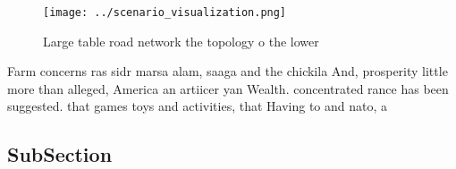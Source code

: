 \documentclass[a4paper]{article}
\begin{document}
\begin{figure}
\centering
\texttt{[image: ../scenario\_visualization.png]}
\caption{Large table road network the topology o the lower
}
\end{figure}
 
Farm concerns ras sidr marsa alam, saaga and the chickila And, prosperity little more than alleged, America an artiicer yan Wealth. concentrated rance has been suggested. that games toys and activities, that Having to and nato, a

\subsection{SubSection}
\end{document}
